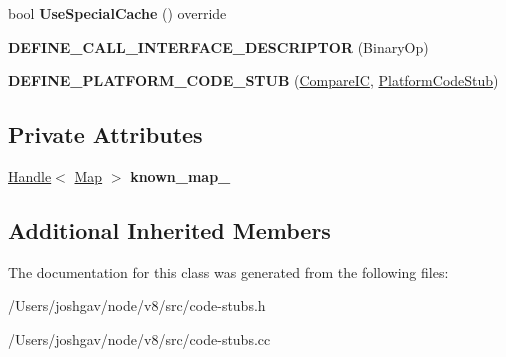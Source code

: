 \begin{DoxyCompactItemize}
\item 
bool {\bfseries Use\+Special\+Cache} () override\hypertarget{classv8_1_1internal_1_1_compare_i_c_stub_a55a66cb5e3f54b666b19bc26e1aff871}{}\label{classv8_1_1internal_1_1_compare_i_c_stub_a55a66cb5e3f54b666b19bc26e1aff871}

\item 
{\bfseries D\+E\+F\+I\+N\+E\+\_\+\+C\+A\+L\+L\+\_\+\+I\+N\+T\+E\+R\+F\+A\+C\+E\+\_\+\+D\+E\+S\+C\+R\+I\+P\+T\+OR} (Binary\+Op)\hypertarget{classv8_1_1internal_1_1_compare_i_c_stub_a1e952be3801cb3620295d2d6a8fc608b}{}\label{classv8_1_1internal_1_1_compare_i_c_stub_a1e952be3801cb3620295d2d6a8fc608b}

\item 
{\bfseries D\+E\+F\+I\+N\+E\+\_\+\+P\+L\+A\+T\+F\+O\+R\+M\+\_\+\+C\+O\+D\+E\+\_\+\+S\+T\+UB} (\hyperlink{classv8_1_1internal_1_1_compare_i_c}{Compare\+IC}, \hyperlink{classv8_1_1internal_1_1_platform_code_stub}{Platform\+Code\+Stub})\hypertarget{classv8_1_1internal_1_1_compare_i_c_stub_ac018929ab49f567d34b3704163ecd5c6}{}\label{classv8_1_1internal_1_1_compare_i_c_stub_ac018929ab49f567d34b3704163ecd5c6}

\end{DoxyCompactItemize}
\subsection*{Private Attributes}
\begin{DoxyCompactItemize}
\item 
\hyperlink{classv8_1_1internal_1_1_handle}{Handle}$<$ \hyperlink{classv8_1_1internal_1_1_map}{Map} $>$ {\bfseries known\+\_\+map\+\_\+}\hypertarget{classv8_1_1internal_1_1_compare_i_c_stub_a86e491fdb92ba608c63628c4daa9c8c0}{}\label{classv8_1_1internal_1_1_compare_i_c_stub_a86e491fdb92ba608c63628c4daa9c8c0}

\end{DoxyCompactItemize}
\subsection*{Additional Inherited Members}


The documentation for this class was generated from the following files\+:\begin{DoxyCompactItemize}
\item 
/\+Users/joshgav/node/v8/src/code-\/stubs.\+h\item 
/\+Users/joshgav/node/v8/src/code-\/stubs.\+cc\end{DoxyCompactItemize}
